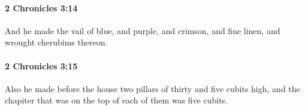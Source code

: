 		\paragraph{2 Chronicles 3:14} %
			\label{2CHRONICLES-3-14}

			And he made the vail of blue, and purple, and crimson, and fine linen, and wrought cherubims thereon.


		\paragraph{2 Chronicles 3:15} %
			\label{2CHRONICLES-3-15}

			Also he made before the house two pillars of thirty and five cubits high, and the chapiter that was on the top of each of them was five cubits.


